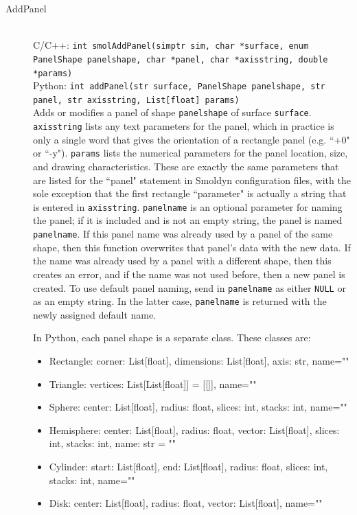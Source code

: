 \documentclass {scrbook}
\newcommand {\ttt} {\texttt}
\begin{document}
\begin{description}
\item[AddPanel]
\hfill \\
C/C++: \ttt{int smolAddPanel(simptr sim, char *surface, enum PanelShape panelshape, char *panel, char *axisstring, double *params)}\\
Python: \ttt{int addPanel(str surface, PanelShape panelshape, str panel, str axisstring, List[float] params)}\\
Adds or modifies a panel of shape \ttt{panelshape} of surface \ttt{surface}. \ttt{axisstring} lists any text parameters for the panel, which in practice is only a single word that gives the orientation of a rectangle panel (e.g. ``+0" or ``-y"). \ttt{params} lists the numerical parameters for the panel location, size, and drawing characteristics. These are exactly the same parameters that are listed for the ``panel" statement in Smoldyn configuration files, with the sole exception that the first rectangle ``parameter" is actually a string that is entered in \ttt{axisstring}. \ttt{panelname} is an optional parameter for naming the panel; if it is included and is not an empty string, the panel is named \ttt{panelname}. If this panel name was already used by a panel of the same shape, then this function overwrites that panel's data with the new data. If the name was already used by a panel with a different shape, then this creates an error, and if the name was not used before, then a new panel is created. To use default panel naming, send in \ttt{panelname} as either \ttt{NULL} or as an empty string. In the latter case, \ttt{panelname} is returned with the newly assigned default name.

In Python, each panel shape is a separate class. These classes are:
\begin{itemize}
\item Rectangle: corner: List[float], dimensions: List[float], axis: str, name=""
\item Triangle: vertices: List[List[float]] = [[]], name=""
\item Sphere: center: List[float], radius: float, slices: int, stacks: int, name=""
\item Hemisphere: center: List[float], radius: float, vector: List[float], slices: int, stacks: int, name: str = ""
\item Cylinder: start: List[float], end: List[float], radius: float, slices: int, stacks: int, name=""
\item Disk: center: List[float], radius: float, vector: List[float], name=""
\end{itemize}


\end{description}
\end{document}
